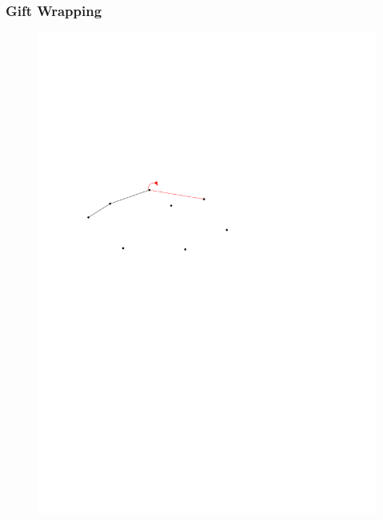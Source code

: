 \begin{frame}
	\frametitle{{Gift Wrapping}}
\begin{figure}[htbp]
	\begin{center}
  	\includegraphics[width=.8\linewidth]{bilder/giftwrap3}
	\end{center}
\end{figure}
\end{frame}

